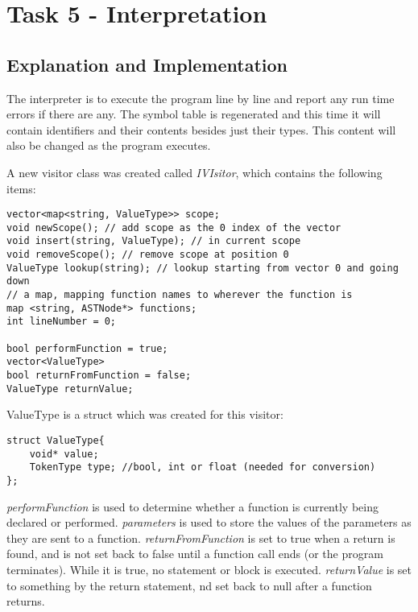 \section{Task 5 - Interpretation}
\subsection{Explanation and Implementation}
The interpreter is to execute the program line by line and report any run time errors if there are any. The symbol table is regenerated and this time it will contain identifiers and their contents besides just their types. This content will also be changed as the program executes.

A new visitor class was created called \textit{IVIsitor}, which contains the following items:

\begin{lstlisting}
vector<map<string, ValueType>> scope;
void newScope(); // add scope as the 0 index of the vector
void insert(string, ValueType); // in current scope
void removeScope(); // remove scope at position 0
ValueType lookup(string); // lookup starting from vector 0 and going down
// a map, mapping function names to wherever the function is
map <string, ASTNode*> functions;
int lineNumber = 0;

bool performFunction = true;
vector<ValueType> 
bool returnFromFunction = false;
ValueType returnValue;
\end{lstlisting}
ValueType is a struct which was created for this visitor:
\begin{lstlisting}
struct ValueType{
	void* value;
	TokenType type; //bool, int or float (needed for conversion)
};
\end{lstlisting}

\textit{performFunction} is used to determine whether a function is currently being declared or performed. \textit{parameters} is used to store the values of the parameters as they are sent to a function. \textit{returnFromFunction} is set to true when a return is found, and is not set back to false until a function call ends (or the program terminates). While it is true, no statement or block is executed. \textit{returnValue} is set to something by the return statement, nd set back to null after a function returns.

